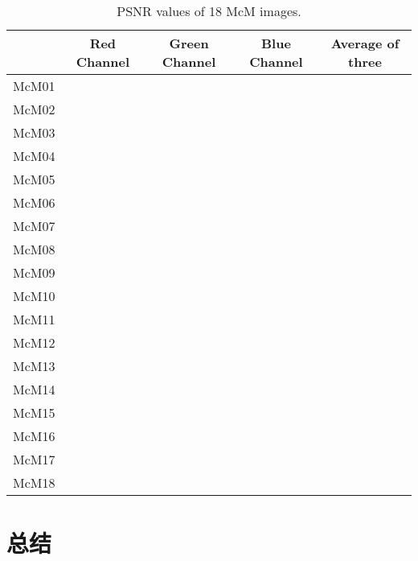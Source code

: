 \documentclass[10.5pt]{myarticle}
\begin{document}
\begin{table}[H]
	\centering
	\caption{PSNR values of 18 McM images.}
	\label{tab:result_task4}
	\begin{tabular}{|c|c|c|c|c|}
		\hline
		 & Red Channel & Green Channel & Blue Channel & Average of three \\ \hline
		McM01 &  &  &  &  \\ \hline
		McM02 &  &  &  &  \\ \hline
		McM03 &  &  &  &  \\ \hline
		McM04 &  &  &  &  \\ \hline
		McM05 &  &  &  &  \\ \hline
		McM06 &  &  &  &  \\ \hline
		McM07 &  &  &  &  \\ \hline
		McM08 &  &  &  &  \\ \hline
		McM09 &  &  &  &  \\ \hline
		McM10 &  &  &  &  \\ \hline
		McM11 &  &  &  &  \\ \hline
		McM12 &  &  &  &  \\ \hline
		McM13 &  &  &  &  \\ \hline
		McM14 &  &  &  &  \\ \hline
		McM15 &  &  &  &  \\ \hline
		McM16 &  &  &  &  \\ \hline
		McM17 &  &  &  &  \\ \hline
		McM18 &  &  &  &  \\ \hline
	\end{tabular}
\end{table}

\clearpage

\section{总结}
\end{document}
